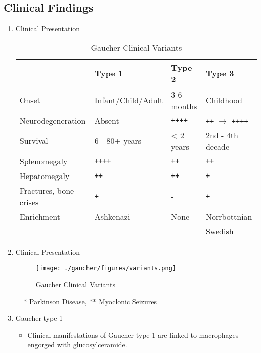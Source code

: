 \documentclass{scrartcl}
\begin{document}
\subsection{Clinical Findings}
\label{sec:orgf9020ac}
\begin{enumerate}
\item Clinical Presentation
\label{sec:orge1712be}

\begin{table}[htbp]
\caption{\label{tab:org6c6c647}
Gaucher Clinical Variants}
\centering
\begin{tabular}{llll}
 & Type 1 & Type 2 & Type 3\\
\hline
Onset & Infant/Child/Adult & 3-6 months & Childhood\\
Neurodegeneration & Absent & \texttt{++++} & \texttt{++} \(\to\) \texttt{++++}\\
Survival & 6 - 80+ years & < 2 years & 2nd - 4th decade\\
Splenomegaly & \texttt{++++} & \texttt{++} & \texttt{++}\\
Hepatomegaly & \texttt{++} & \texttt{++} & \texttt{+}\\
Fractures, bone crises & \texttt{+} & - & \texttt{+}\\
Enrichment & Ashkenazi & None & Norrbottnian\\
 &  &  & Swedish\\
\end{tabular}
\end{table}

\item Clinical Presentation
\label{sec:orgfeb4626}

\begin{figure}[htbp]
\centering
\texttt{[image: ./gaucher/figures/variants.png]}
\caption{\label{fig:org3458815}
Gaucher Clinical Variants}
\end{figure}

= * Parkinson Disease, ** Myoclonic Seizures =
\item Gaucher type 1
\label{sec:orgf616eae}
\begin{itemize}
\item Clinical manifestations of Gaucher type 1 are linked to macrophages
engorged with glucosylceramide.


\end{itemize}
\end{enumerate}
\end{document}
